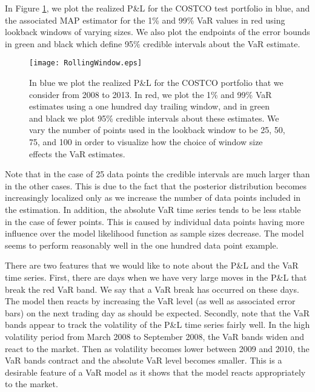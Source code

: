 \documentclass{amsart}
\begin{document}
In Figure \ref{perform1}, we plot the realized P\&L for the COSTCO test portfolio in 
blue, and the associated MAP estimator for the 1\% and 99\% VaR values in red using lookback 
windows of varying sizes.  We also plot the endpoints
of the error bounds in green and black which define 95\% credible intervals 
about the VaR estimate.    
\begin{figure}[h!]
    \centering
    \texttt{[image: RollingWindow.eps]}
    \caption{In blue we plot the realized P\&L for the COSTCO portfolio that we consider from 
    2008 to 2013.  In red, we plot the 1\% and 99\% VaR estimates using a one hundred day trailing 
    window, and in green and black we plot 95\% credible intervals about these estimates. We vary 
    the number of points used in the lookback window to be 25, 50, 75, and 100 in order to visualize 
    how the choice of window size effects the VaR estimates.}
    \label{perform1}
\end{figure}
%
Note that in the case of 25 data points the credible intervals are much larger than in
the other cases.  This is due to the fact that the posterior distribution becomes increasingly 
localized only as we increase the number of data points included in the estimation.  In addition, 
the absolute VaR time series tends to be less stable in the case of fewer points.  This is caused 
by individual data points having more influence over the model likelihood function as sample sizes 
decrease.  The model seems to perform reasonably well in the one hundred data point example.  

There are two features that we would like to note about the P\&L and the VaR time series.  
First, there are days when we have very large moves in the P\&L that break the red 
VaR band.  We say that a VaR break has occurred on these days.  The model then reacts by 
increasing the VaR level (as well as associated error bars) on the next trading day as should 
be expected.  Secondly, note that the VaR bands appear to track the volatility of the 
P\&L time series fairly well.  In the high volatility period from March 2008 to September 2008, the
VaR bands widen and react to the market.  Then as volatility becomes lower between 2009 and 2010, the 
VaR bands contract and the absolute VaR level becomes smaller. This is a desirable feature of 
a VaR model as it shows that the model reacts appropriately to the market. 
\end{document}
